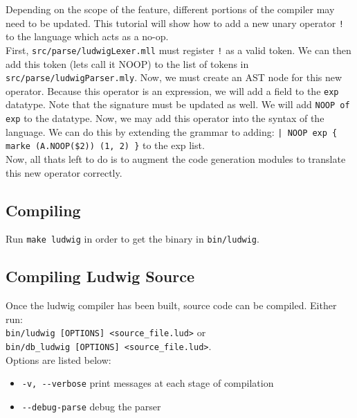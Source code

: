 Depending on the scope of the feature, different portions of the compiler may need to be updated. This tutorial will show how to add a new unary operator \verb|!| to the language which acts as a no-op.\\

First, \verb|src/parse/ludwigLexer.mll| must register \verb|!| as a valid token. We can then add this token (lets call it NOOP) to the list of tokens in \verb|src/parse/ludwigParser.mly|. Now, we must create an AST node for this new operator. Because this operator is an expression, we will add a field to the \verb|exp| datatype. Note that the signature must be updated as well. We will add \verb|NOOP of exp| to the datatype. Now, we may add this operator into the syntax of the language. We can do this by extending the grammar to adding:
\verb"| NOOP exp { marke (A.NOOP($2)) (1, 2) }" to the exp list.\\

Now, all thats left to do is to augment the code generation modules to translate this new operator correctly.\\

\subsection{Compiling}
\label{compilation}
Run \verb|make ludwig| in order to get the binary in \verb|bin/ludwig|.

\subsection{Compiling Ludwig Source}
Once the ludwig compiler has been built, source code can be compiled. Either run:\\

\verb|bin/ludwig [OPTIONS] <source_file.lud>| or\\
\verb|bin/db_ludwig [OPTIONS] <source_file.lud>|.\\

Options are listed below:

\begin{itemize}
\item \verb|-v, --verbose| print messages at each stage of compilation
\item \verb|--debug-parse| debug the parser
\end{itemize}
